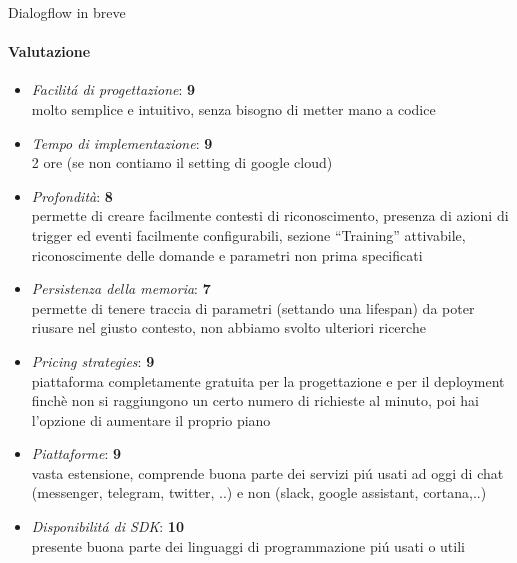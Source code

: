 \documentclass[]{article}
\begin{document}
\begin{center}
\footnotesize{Dialogflow in breve}
\end{center}

\paragraph{Valutazione}
\begin{itemize}
\item \textit{Facilitá di progettazione}: \textbf{9} \\ molto semplice e intuitivo, senza bisogno di metter mano a codice

\item \textit{Tempo di implementazione}: \textbf{9} \\ 2 ore (se non contiamo il setting di google cloud)  

\item \textit{Profondità}: \textbf{8} \\  permette di creare facilmente contesti di riconoscimento, presenza di azioni di trigger ed eventi facilmente configurabili, sezione “Training” attivabile, riconoscimente delle domande e parametri non prima specificati
\item \textit{Persistenza della memoria}: \textbf{7} \\ permette di tenere traccia di parametri (settando una lifespan) da poter riusare nel giusto contesto, non abbiamo svolto ulteriori ricerche
\item \textit{Pricing strategies}: \textbf{9} \\ piattaforma completamente gratuita per la progettazione e per il deployment finchè non si raggiungono un certo numero di richieste al minuto, poi hai l’opzione di aumentare il proprio piano

\item \textit{Piattaforme}: \textbf{9} \\ vasta estensione, comprende buona parte dei servizi piú usati ad oggi di chat (messenger, telegram, twitter, ..) e non (slack, google assistant, cortana,..) 
\item \textit{Disponibilitá di SDK}: \textbf{10} \\  presente buona parte dei linguaggi di programmazione piú usati o utili
\end{itemize}
\end{document}
